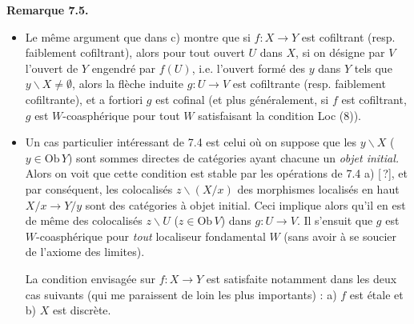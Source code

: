 \documentclass[11pt]{article}
\newcommand{\printedpage}[1]{\marginpar{\footnotesize p.~#1}}
\newcommand{\msp}[1]{\marginpar{\footnotesize [#1]}}
\newcommand{\Ob}{\mathrm{Ob}}
\begin{document}
\noindent\textbf{Remarque 7.5.}
\begin{itemize}
\item[1)] Le même argument que dans c) montre que si $f : X \longrightarrow Y$ est cofiltrant (resp. faiblement cofiltrant), alors pour tout ouvert $U$ dans $X$, si on désigne par $V$ l'ouvert de $Y$ engendré par $f(U)$, i.e. l'ouvert formé des $y$ dans $Y$ tels que $y\backslash X \neq \emptyset$, alors la flèche induite $g : U \longrightarrow V$ est cofiltrante (resp. faiblement cofiltrante), et a fortiori $g$ est cofinal (et plus généralement, si $f$ est cofiltrant, $g$ est $W$-coasphérique pour tout $W$ satisfaisant la condition Loc (8)).

\msp{page 96}
\item[2)] Un cas particulier intéressant de 7.4 est celui où on suppose que les $y\backslash X$ ($y \in \Ob\,Y$) sont sommes directes de catégories ayant chacune un \textit{objet initial.} Alors on voit que cette condition est stable par les opérations de 7.4 a) [\,?], et par conséquent, les colocalisés $z\backslash(X/x)$ des morphismes localisés en haut $X/x \longrightarrow Y/y$ sont des catégories à objet initial. Ceci implique alors qu'il en est de même des colocalisés $z\backslash U$ ($z \in \Ob\,V$) dans $g : U \longrightarrow V$. Il s'ensuit que $g$ est $W$-coasphérique pour \textit{tout} localiseur fondamental $W$ (sans avoir à se soucier de l'axiome des limites).

La condition envisagée sur $f : X \longrightarrow Y$ est satisfaite notamment dans les deux cas suivants (qui me paraissent de loin les plus importants) : a) $f$ est étale et b) $X$ est discrète.
\end{itemize}

\clearpage
\printedpage{60}

\msp{page 97}
\end{document}
